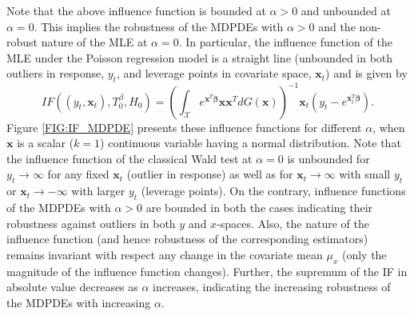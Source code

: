\documentclass[a4paper]{article}%
\begin{document}
Note that the above influence function is bounded at $\alpha>0$ and unbounded
at $\alpha=0$. This implies the robustness of the MDPDEs with $\alpha>0$ and
the non-robust nature of the MLE at $\alpha=0$. In particular, the influence
function of the MLE under the Poisson regression model is a straight line
(unbounded in both outliers in response, $y_{t}$, and leverage points in
covariate space, $\boldsymbol{x}_{t}$) and is given by
\[
IF((y_{t}, \boldsymbol{x}_{t}), {T}_{0}^{\beta}, H_{0}) = \left(
{\int_{\mathcal{X}}}e^{\boldsymbol{x}^{T}\boldsymbol{\beta}}\boldsymbol{x}%
\boldsymbol{x}^{T}dG(\boldsymbol{x})\right) ^{-1} \boldsymbol{x}_{t} (y_{t} -
e^{\boldsymbol{x}_{t}^{T}\boldsymbol{\beta}}).
\]
Figure \ref{FIG:IF_MDPDE} presents these influence functions for different $\alpha$, 
when $\boldsymbol{x}$ is a scalar ($k=1$) continuous variable 
having a normal distribution. Note that the influence function of
the classical Wald test at $\alpha=0$ is unbounded for $y_{t}%
\rightarrow\infty$ for any fixed $\boldsymbol{x}_{t}$ (outlier in response) as
well as for $\boldsymbol{x}_{t} \rightarrow\infty$ with small $y_{t}$ or
$\boldsymbol{x}_{t} \rightarrow-\infty$ with larger $y_{t}$ (leverage points).
On the contrary, influence functions of the MDPDEs with $\alpha>0$ are bounded
in both the cases indicating their robustness against outliers in both $y$ and
$x$-spaces. Also, the nature of the influence function (and hence robustness
of the corresponding estimators) remains invariant with respect any change in
the covariate mean $\mu_{x}$ (only the magnitude of the influence function
changes). Further, the supremum of the IF in absolute value decreases as
$\alpha$ increases, indicating the increasing robustness of the MDPDEs with
increasing $\alpha$.
\end{document}
